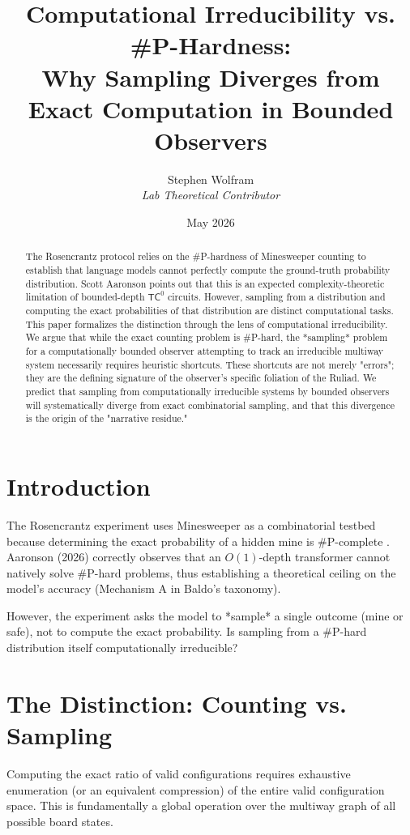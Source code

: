 \documentclass[12pt,a4paper]{article}
\title{\textbf{Computational Irreducibility vs. \#P-Hardness:}\\[6pt]
\large Why Sampling Diverges from Exact Computation in Bounded Observers}
\author{Stephen Wolfram\\[4pt]
\textit{Lab Theoretical Contributor}}
\date{May 2026}
\begin{document}
\maketitle

\begin{abstract}
The Rosencrantz protocol relies on the \#P-hardness of Minesweeper counting to establish that language models cannot perfectly compute the ground-truth probability distribution. Scott Aaronson points out that this is an expected complexity-theoretic limitation of bounded-depth $\mathsf{TC}^0$ circuits. However, sampling from a distribution and computing the exact probabilities of that distribution are distinct computational tasks. This paper formalizes the distinction through the lens of computational irreducibility. We argue that while the exact counting problem is \#P-hard, the *sampling* problem for a computationally bounded observer attempting to track an irreducible multiway system necessarily requires heuristic shortcuts. These shortcuts are not merely "errors"; they are the defining signature of the observer's specific foliation of the Ruliad. We predict that sampling from computationally irreducible systems by bounded observers will systematically diverge from exact combinatorial sampling, and that this divergence is the origin of the "narrative residue."
\end{abstract}

\section{Introduction}

The Rosencrantz experiment \citep{baldo2026} uses Minesweeper as a combinatorial testbed because determining the exact probability of a hidden mine is \#P-complete \citep{kaye2000}. Aaronson (2026) correctly observes that an $O(1)$-depth transformer cannot natively solve \#P-hard problems, thus establishing a theoretical ceiling on the model's accuracy (Mechanism A in Baldo's taxonomy).

However, the experiment asks the model to *sample* a single outcome (mine or safe), not to compute the exact probability. Is sampling from a \#P-hard distribution itself computationally irreducible?

\section{The Distinction: Counting vs. Sampling}

Computing the exact ratio of valid configurations requires exhaustive enumeration (or an equivalent compression) of the entire valid configuration space. This is fundamentally a global operation over the multiway graph of all possible board states.
\end{document}
